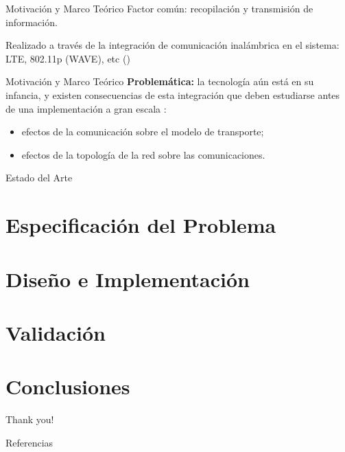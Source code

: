 \documentclass[aspectratio=169]{beamer}
\begin{document}
\begin{frame}{Motivación y Marco Teórico}
Factor común: recopilación y transmisión de información.

Realizado a través de la integración de comunicación inalámbrica en el sistema: LTE, 802.11p (WAVE), etc (\autocite{80211dailey,80211wave,80215vanet,dar2010wireless})
\end{frame}

\begin{frame}{Motivación y Marco Teórico}
\textbf{Problemática:} la tecnología aún está en su infancia, y existen consecuencias de esta integración que deben estudiarse antes de una implementación a gran escala \autocite{sommer2008need}:
\begin{itemize}
    \item efectos de la comunicación sobre el modelo de transporte;
    \item efectos de la topología de la red sobre las comunicaciones.
\end{itemize}
\end{frame}


\begin{frame}{Estado del Arte}
\end{frame}
    
\section{Especificación del Problema}
\section{Diseño e Implementación}
\section{Validación}
\section{Conclusiones}
\begin{frame}[standout]
Thank you!
\end{frame}

\begin{frame}[t,allowframebreaks]{Referencias}
\printbibliography[heading=none]
\end{frame}
\end{document}
